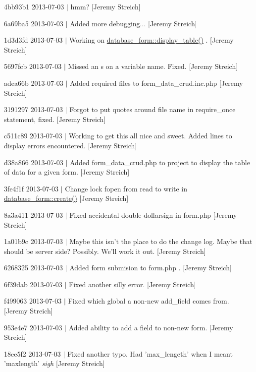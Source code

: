 \begin{DoxyItemize}
\item 4bb93b1 2013-\/07-\/03 $|$ hmm? \mbox{[}Jeremy Streich\mbox{]}
\item 6a69ba5 2013-\/07-\/03 $|$ Added more debugging... \mbox{[}Jeremy Streich\mbox{]}
\item 1d3d3fd 2013-\/07-\/03 $|$ Working on \hyperlink{classdatabase__form_a73106bec9001ca0fe255e74a37982072}{database\-\_\-form\-::display\-\_\-table()} . \mbox{[}Jeremy Streich\mbox{]}
\item 5697fcb 2013-\/07-\/03 $|$ Missed an s on a variable name. Fixed. \mbox{[}Jeremy Streich\mbox{]}
\item adea66b 2013-\/07-\/03 $|$ Added required files to form\-\_\-data\-\_\-crud.\-inc.\-php \mbox{[}Jeremy Streich\mbox{]}
\item 3191297 2013-\/07-\/03 $|$ Forgot to put quotes around file name in require\-\_\-once statement, fixed. \mbox{[}Jeremy Streich\mbox{]}
\item c511c89 2013-\/07-\/03 $|$ Working to get this all nice and sweet. Added lines to display errors encountered. \mbox{[}Jeremy Streich\mbox{]}
\item d38a866 2013-\/07-\/03 $|$ Added form\-\_\-data\-\_\-crud.\-php to project to display the table of data for a given form. \mbox{[}Jeremy Streich\mbox{]}
\item 3fe4f1f 2013-\/07-\/03 $|$ Change lock fopen from read to write in \hyperlink{classdatabase__form_a2f217d182a55038d501b66f2a2d51abc}{database\-\_\-form\-::create()} \mbox{[}Jeremy Streich\mbox{]}
\item 8a3a411 2013-\/07-\/03 $|$ Fixed accidental double dollarsign in form.\-php \mbox{[}Jeremy Streich\mbox{]}
\item 1a01b9c 2013-\/07-\/03 $|$ Maybe this isn't the place to do the change log. Maybe that should be server side? Possibly. We'll work it out. \mbox{[}Jeremy Streich\mbox{]}
\item 6268325 2013-\/07-\/03 $|$ Added form submision to form.\-php . \mbox{[}Jeremy Streich\mbox{]}
\item 6f39dab 2013-\/07-\/03 $|$ Fixed another silly error. \mbox{[}Jeremy Streich\mbox{]}
\item f499063 2013-\/07-\/03 $|$ Fixed which global a non-\/new add\-\_\-field comes from. \mbox{[}Jeremy Streich\mbox{]}
\item 953e4e7 2013-\/07-\/03 $|$ Added ability to add a field to non-\/new form. \mbox{[}Jeremy Streich\mbox{]}
\item 18ee5f2 2013-\/07-\/03 $|$ Fixed another typo. Had 'max\-\_\-lengeth' when I meant 'maxlength' {\itshape sigh} \mbox{[}Jeremy Streich\mbox{]}

\end{DoxyItemize}
